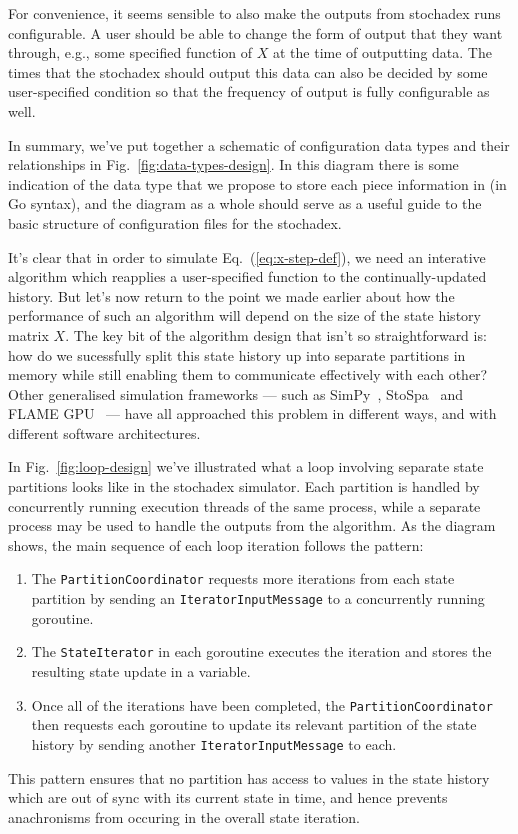For convenience, it seems sensible to also make the outputs from stochadex runs configurable. A user should be able to change the form of output that they want through, e.g., some specified function of $X$ at the time of outputting data. The times that the stochadex should output this data can also be decided by some user-specified condition so that the frequency of output is fully configurable as well. 

In summary, we've put together a schematic of configuration data types and their relationships in Fig.~\ref{fig:data-types-design}. In this diagram there is some indication of the data type that we propose to store each piece information in (in Go syntax), and the diagram as a whole should serve as a useful guide to the basic structure of configuration files for the stochadex.

It's clear that in order to simulate Eq.~(\ref{eq:x-step-def}), we need an interative algorithm which reapplies a user-specified function to the continually-updated history. But let's now return to the point we made earlier about how the performance of such an algorithm will depend on the size of the state history matrix $X$. The key bit of the algorithm design that isn't so straightforward is: how do we sucessfully split this state history up into separate partitions in memory while still enabling them to communicate effectively with each other? Other generalised simulation frameworks --- such as SimPy~\cite{simpy}, StoSpa~\cite{stospa} and FLAME GPU~\cite{flamegpu} --- have all approached this problem in different ways, and with different software architectures. 

In Fig.~\ref{fig:loop-design} we've illustrated what a loop involving separate state partitions looks like in the stochadex simulator. Each partition is handled by concurrently running execution threads of the same process, while a separate process may be used to handle the outputs from the algorithm. As the diagram shows, the main sequence of each loop iteration follows the pattern: 
\begin{enumerate}
\item{The \texttt{PartitionCoordinator} requests more iterations from each state partition by sending an \texttt{IteratorInputMessage} to a concurrently running goroutine.}
\item{The \texttt{StateIterator} in each goroutine executes the iteration and stores the resulting state update in a variable.}
\item{Once all of the iterations have been completed, the \texttt{PartitionCoordinator} then requests each goroutine to update its relevant partition of the state history by sending another \texttt{IteratorInputMessage} to each.}
\end{enumerate}
This pattern ensures that no partition has access to values in the state history which are out of sync with its current state in time, and hence prevents anachronisms from occuring in the overall state iteration. 

